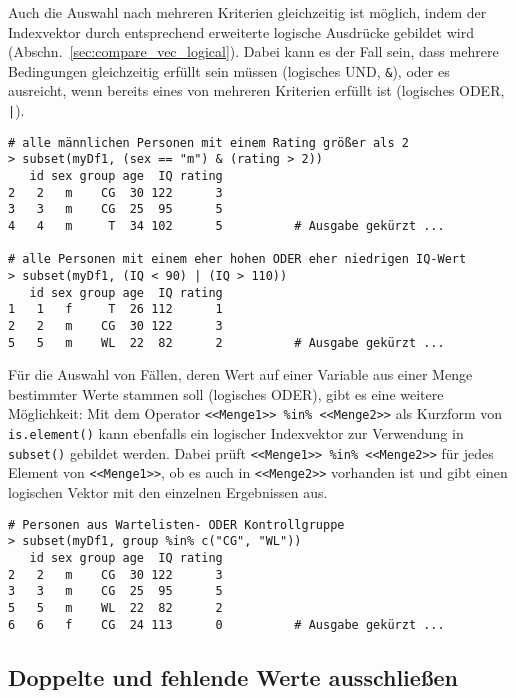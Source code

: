 Auch die Auswahl nach mehreren Kriterien gleichzeitig ist möglich, indem der Indexvektor durch entsprechend erweiterte logische Ausdrücke gebildet wird (Abschn.\ \ref{sec:compare_vec_logical}). Dabei kann es der Fall sein, dass mehrere Bedingungen gleichzeitig erfüllt sein müssen (logisches UND, \lstinline!&!), oder es ausreicht, wenn bereits eines von mehreren Kriterien erfüllt ist (logisches ODER, \lstinline!|!).
\begin{lstlisting}
# alle männlichen Personen mit einem Rating größer als 2
> subset(myDf1, (sex == "m") & (rating > 2))
   id sex group age  IQ rating
2   2   m    CG  30 122      3
3   3   m    CG  25  95      5
4   4   m     T  34 102      5          # Ausgabe gekürzt ...

# alle Personen mit einem eher hohen ODER eher niedrigen IQ-Wert
> subset(myDf1, (IQ < 90) | (IQ > 110))
   id sex group age  IQ rating
1   1   f     T  26 112      1
2   2   m    CG  30 122      3
5   5   m    WL  22  82      2          # Ausgabe gekürzt ...
\end{lstlisting}

Für die Auswahl von Fällen, deren Wert auf einer Variable aus einer Menge bestimmter Werte stammen soll (logisches ODER), gibt es eine weitere Möglichkeit: Mit dem Operator \lstinline!<<Menge1>> %in% <<Menge2>>! als Kurzform von \lstinline!is.element()! kann ebenfalls ein logischer Indexvektor zur Verwendung in \lstinline!subset()! gebildet werden. Dabei prüft \lstinline!<<Menge1>> %in% <<Menge2>>! für jedes Element von \lstinline!<<Menge1>>!, ob es auch in \lstinline!<<Menge2>>! vorhanden ist und gibt einen logischen Vektor mit den einzelnen Ergebnissen aus.
\begin{lstlisting}
# Personen aus Wartelisten- ODER Kontrollgruppe
> subset(myDf1, group %in% c("CG", "WL"))
   id sex group age  IQ rating
2   2   m    CG  30 122      3
3   3   m    CG  25  95      5
5   5   m    WL  22  82      2
6   6   f    CG  24 113      0          # Ausgabe gekürzt ...
\end{lstlisting}

\subsection{Doppelte und fehlende Werte ausschließen}
\label{sec:naDf}

